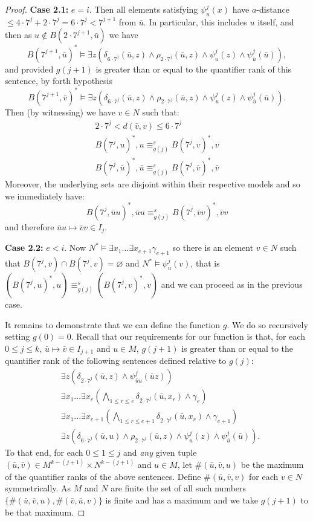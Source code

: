 \documentclass{lmcs} %
\newcommand{\?}{\ensuremath{\mkern0.4\thinmuskip}}
\let\bigland=\bigwedge%
\begin{document}
\begin{proof}
    \noindent
    \textbf{Case 2.1:}
    $e=i$. Then all elements satisfying $\psi^j_u(x)$ have $a$-distance $\leq 4\cdot 7^j+2\cdot 7^j=6\cdot 7^j< 7^{j+1}$ from $\bar{u}$. In particular, this includes $u$ itself, and then as $u\not\in B(2\cdot 7^{j+1},\bar{u})$ we have \[B(7^{j+1},\bar{u})^\ast\models\exists z(\delta_{6\cdot 7^j}(\bar{u},z)\land \rho_{2\cdot 7^j}(\bar{u},z)\land \psi^j_u(z)\land \psi^j_{\bar{u}}(\bar{u})),\]
    and provided $g(j+1)$ is greater than or equal to the quantifier rank of this sentence, by forth hypothesis \[B(7^{j+1},\bar{v})^\ast\models\exists z(\delta_{6\cdot 7^j}(\bar{u},z)\land \rho_{2\cdot 7^j}(\bar{u},z)\land \psi^j_u(z)\land \psi^j_{\bar{u}}(\bar{u})).\] Then (by witnessing) we have $v\in N$ such that: \begin{gather*}
        2\cdot 7^j<d(\bar{v},v)\leq 6\cdot 7^j\\
        B(7^j,u)^\ast,u\equiv^s_{g(j)} B(7^j,v)^\ast,v\\
        B(7^j,\bar{u})^\ast,\bar{u} \equiv^s_{g(j)} B(7^j,\bar{v})^\ast,\bar{v}
    \end{gather*}
    Moreover, the underlying sets are disjoint within their respective models and so we immediately have:\[B(7^j,\bar{u}u)^\ast,\bar{u}u\equiv^s_{g(j)} B(7^j,\bar{v}v)^\ast,\bar{v}v\]
    and therefore $\bar{u}u\mapsto\bar{v}v\in I_j$.

    \noindent
    \textbf{Case 2.2:}
    $e<i$. Now $N^\ast\models\exists x_1...\exists x_{e+1}\gamma_{e+1}$ so there is an element $v\in N$ such that $B(7^j,\bar{v})\cap B(7^j,v)=\varnothing$ and $N^\ast\models \psi^j_u(v)$, that is $(B(7^j,u)^\ast,u)\equiv^s_{g(j)} (B(7^j,v)^\ast,v)$ and we can proceed as in the previous case.

    It remains to demonstrate that we can define the function $g$. We do so recursively setting $g(0)=0$. Recall that our requirements for our function is that, for each $0\leq j\leq k$, $\bar{u}\mapsto \bar{v}\in I_{j+1}$ and $u\in M$, $g(j+1)$ is greater than or equal to the quantifier rank of the following sentences defined relative to $g(j)$:\begin{align*}
        &\exists z(\delta_{2\cdot 7^j}(\bar{u},z)\land\psi^j_{\bar{u}u}(\bar{u}z))\\
        &\exists x_1...\exists x_e(\bigland\limits_{1\leq r\leq e} \delta_{2\cdot 7^j}(\bar{u},x_r)\land \gamma_e)\\
        &\exists x_1...\exists x_{e+1}(\bigland\limits_{1\leq r\leq e+1}\delta_{2\cdot 7^j}(\bar{u},x_r)\land \gamma_{e+1})\\
        &\exists z(\delta_{6\cdot 7^j}(\bar{u},u)\land \rho_{2\cdot 7^j}(\bar{u},z)\land \psi^j_u(z)\land \psi^j_{\bar{u}}(\bar{u})).
    \end{align*}
    To that end, for each $0\leq 1\leq j$ and \emph{any} given tuple $(\bar{u},\bar{v})\in M^{k-(j+1)}\times N^{k-(j+1)}$ and $u\in M$, let $\#(\bar{u},\bar{v},u)$ be the maximum of the quantifier ranks of the above sentences. Define $\#(\bar{u},\bar{v},v)$ for each $v\in N$ symmetrically. As $M$ and $N$ are finite the set of all such numbers $\{\#(\bar{u},\bar{v},u),\#(\bar{v},\bar{u},v)\}$ is finite and has a maximum and we take $g(j+1)$ to be that maximum.
\end{proof}
\end{document}
